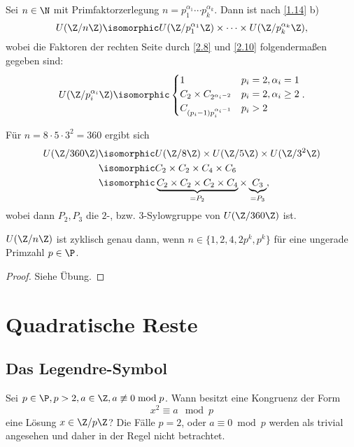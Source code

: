 \begin{kor} \label{2.11}
	Sei $n \in \N$ mit Primfaktorzerlegung $n = p_1^{\alpha_1} \dotsb p_k^{\alpha_k}$.
	Dann ist nach \ref{1.14} b)
	\[
		U(\Z / n\Z) \isomorphic U(\Z / p_1^{\alpha_1}\Z) \times \dotsb \times U(\Z / p_k^{\alpha_k} \Z),
	\]
	wobei die Faktoren der rechten Seite durch \ref{2.8} und \ref{2.10} folgendermaßen gegeben sind:
	\[
		U(\Z / p_i^{\alpha_i} \Z)
		\isomorphic \begin{cases}
			1 & p_i = 2, \alpha_i = 1 \\
			C_2 \times C_{2^{\alpha_i - 2}} & p_i = 2, \alpha_i \ge 2 \\
			C_{(p_i-1)p_i^{\alpha_i - 1}} & p_i > 2
		\end{cases}.
	\]
\end{kor}

\begin{ex*}
	Für $n = 8 \cdot 5 \cdot 3^2 = 360$ ergibt sich
	\begin{align*}
		U(\Z / 360 \Z)
		&\isomorphic U(\Z / 8 \Z) \times U(\Z / 5 \Z) \times U(\Z / 3^2 \Z) \\
		&\isomorphic C_2 \times C_2 \times C_4 \times C_6 \\
		&\isomorphic \underbrace{C_2 \times C_2 \times C_2 \times  C_4}_{=P_2} \times \underbrace{C_3}_{=P_3},
	\end{align*}
	wobei dann $P_2, P_3$ die $2$-, bzw. $3$-Sylowgruppe von $U(\Z / 360 \Z)$ ist.
\end{ex*}

\begin{kor} \label{2.12}
	$U(\Z / n\Z)$ ist zyklisch genau dann, wenn $n \in \{1, 2, 4, 2p^k, p^k \}$ für eine ungerade Primzahl $p \in \P$.
	\begin{proof}
		Siehe Übung.
		\Exercise
	\end{proof}
\end{kor}


\section{Quadratische Reste}


\subsection{Das Legendre-Symbol}

Sei $p \in \P, p > 2, a \in \Z, a \not\equiv 0 \bmod p$.
Wann besitzt eine Kongruenz der Form
\[
	x^2 \equiv a \mod p
\]
eine Lösung $x \in \Z / p \Z$?
Die Fälle $p = 2$, oder $a \equiv 0 \bmod p$ werden als trivial angesehen und daher in der Regel nicht betrachtet.

